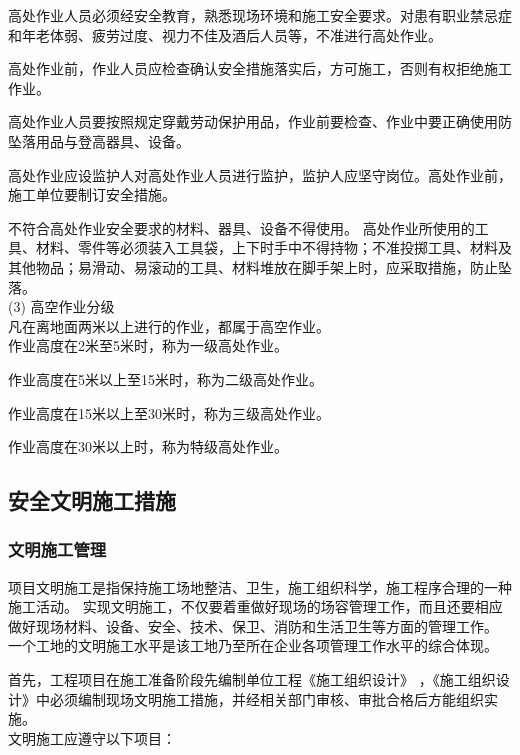  高处作业人员必须经安全教育，熟悉现场环境和施工安全要求。对患有职业禁忌症和年老体弱、疲劳过度、视力不佳及酒后人员等，不准进行高处作业。

 高处作业前，作业人员应检查确认安全措施落实后，方可施工，否则有权拒绝施工作业。

 高处作业人员要按照规定穿戴劳动保护用品，作业前要检查、作业中要正确使用防坠落用品与登高器具、设备。 

 高处作业应设监护人对高处作业人员进行监护，监护人应坚守岗位。高处作业前，施工单位要制订安全措施。

 不符合高处作业安全要求的材料、器具、设备不得使用。
高处作业所使用的工具、材料、零件等必须装入工具袋，上下时手中不得持物；不准投掷工具、材料及其他物品；易滑动、易滚动的工具、材料堆放在脚手架上时，应采取措施，防止坠落。\\

(3) 高空作业分级\\

凡在离地面两米以上进行的作业，都属于高空作业。\\

 作业高度在2米至5米时，称为一级高处作业。

 作业高度在5米以上至15米时，称为二级高处作业。

 作业高度在15米以上至30米时，称为三级高处作业。

 作业高度在30米以上时，称为特级高处作业。\\

\subsection{安全文明施工措施}
\subsubsection{文明施工管理}

项目文明施工是指保持施工场地整洁、卫生，施工组织科学，施工程序合理的一种施工活动。
实现文明施工，不仅要着重做好现场的场容管理工作，而且还要相应做好现场材料、设备、安全、技术、保卫、消防和生活卫生等方面的管理工作。
一个工地的文明施工水平是该工地乃至所在企业各项管理工作水平的综合体现。

首先，工程项目在施工准备阶段先编制单位工程《施工组织设计》
，《施工组织设计》中必须编制现场文明施工措施，并经相关部门审核、审批合格后方能组织实施。\\

文明施工应遵守以下项目：

